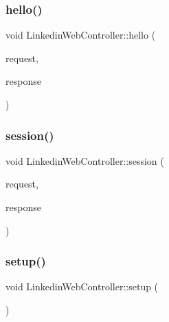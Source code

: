 \mbox{\label{classLinkedinWebController_af300383547b94080bc7edbee9624b852}} 
\subsubsection{\texorpdfstring{hello()}{hello()}}
{\footnotesize\ttfamily void Linkedin\+Web\+Controller\+::hello (\begin{DoxyParamCaption}\item[{Mongoose\+::\+Request \&}]{request,  }\item[{Mongoose\+::\+Stream\+Response \&}]{response }\end{DoxyParamCaption})}

\mbox{\label{classLinkedinWebController_acdbbbe5c9139f0f7959ca70df699c255}} 
\subsubsection{\texorpdfstring{session()}{session()}}
{\footnotesize\ttfamily void Linkedin\+Web\+Controller\+::session (\begin{DoxyParamCaption}\item[{Mongoose\+::\+Request \&}]{request,  }\item[{Mongoose\+::\+Stream\+Response \&}]{response }\end{DoxyParamCaption})}

\mbox{\label{classLinkedinWebController_aa685544945b192b9149deaba1304f33b}} 
\subsubsection{\texorpdfstring{setup()}{setup()}}
{\footnotesize\ttfamily void Linkedin\+Web\+Controller\+::setup (\begin{DoxyParamCaption}{ }\end{DoxyParamCaption})\hspace{0.3cm}{\ttfamily [virtual]}}

